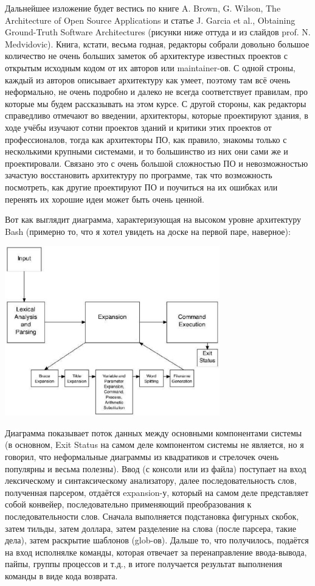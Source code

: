 \documentclass[a5paper]{article}
\begin{document}
Дальнейшее изложение будет вестись по книге A. Brown, G. Wilson, The Architecture of Open Source Applications и статье J. Garcia et al., Obtaining Ground-Truth Software Architectures (рисунки ниже оттуда и из слайдов prof. N. Medvidovic). Книга, кстати, весьма годная, редакторы собрали довольно большое количество не очень больших заметок об архитектуре известных проектов с открытым исходным кодом от их авторов или maintainer-ов. С одной строны, каждый из авторов описывает архитектуру как умеет, поэтому там всё очень неформально, не очень подробно и далеко не всегда соответствует правилам, про которые мы будем рассказывать на этом курсе. С другой стороны, как редакторы справедливо отмечают во введении, архитекторы, которые проектируют здания, в ходе учёбы изучают сотни проектов зданий и критики этих проектов от профессионалов, тогда как архитекторы ПО, как правило, знакомы только с несколькими крупными системами, и то большинство из них они сами же и проектировали. Связано это с очень большой сложностью ПО и невозможностью зачастую восстановить архитектуру по программе, так что возможность посмотреть, как другие проектируют ПО и поучиться на их ошибках или перенять их хорошие идеи может быть очень ценной.

Вот как выглядит диаграмма, характеризующая на высоком уровне архитектуру Bash (примерно то, что я хотел увидеть на доске на первой паре, наверное):

\begin{center}
    \includegraphics[width=0.7\textwidth]{bashArchitecture.png}
\end{center}

Диаграмма показывает поток данных между основными компонентами системы (в основном, Exit Status на самом деле компонентом системы не является, но я говорил, что неформальные диаграммы из квадратиков и стрелочек очень популярны и весьма полезны). Ввод (с консоли или из файла) поступает на вход лексическому и синтаксическому анализатору, далее последовательность слов, полученная парсером, отдаётся expansion-у, который на самом деле представляет собой конвейер, последовательно применяющий преобразования к последовательности слов. Сначала выполняется подстановка фигурных скобок, затем тильды, затем доллара, затем разделение на слова (после парсера, такие дела), затем раскрытие шаблонов (glob-ов). Дальше то, что получилось, подаётся на вход исполнялке команды, которая отвечает за перенаправление ввода-вывода, пайпы, группы процессов и т.д., в итоге получается результат выполнения команды в виде кода возврата.
\end{document}

